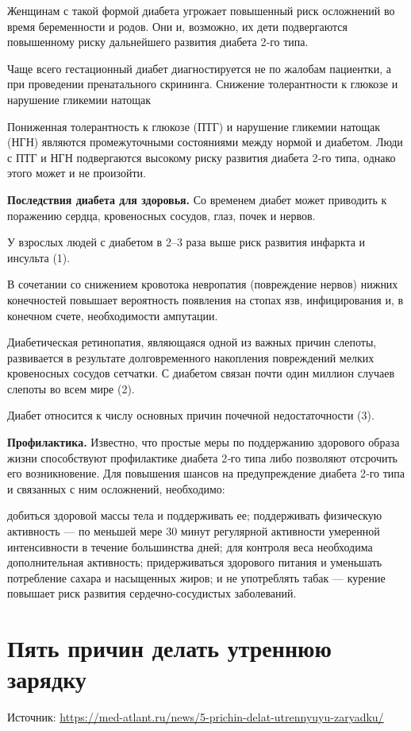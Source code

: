 Женщинам с такой формой диабета угрожает повышенный риск осложнений во время беременности и родов. Они и, возможно, их дети подвергаются повышенному риску дальнейшего развития диабета 2‑го типа.

Чаще всего гестационный диабет диагностируется не по жалобам пациентки, а при проведении пренатального скрининга.
Снижение толерантности к глюкозе и нарушение гликемии натощак

Пониженная толерантность к глюкозе (ПТГ) и нарушение гликемии натощак (НГН) являются промежуточными состояниями между нормой и диабетом. Люди с ПТГ и НГН подвергаются высокому риску развития диабета 2‑го типа, однако этого может и не произойти.


\textbf{Последствия диабета для здоровья.}
Со временем диабет может приводить к поражению сердца, кровеносных сосудов, глаз, почек и нервов.

У взрослых людей с диабетом в 2–3 раза выше риск развития инфаркта и инсульта (1).

В сочетании со снижением кровотока невропатия (повреждение нервов) нижних конечностей повышает вероятность появления на стопах язв, инфицирования и, в конечном счете, необходимости ампутации.

Диабетическая ретинопатия, являющаяся одной из важных причин слепоты, развивается в результате долговременного накопления повреждений мелких кровеносных сосудов сетчатки. С диабетом связан почти один миллион случаев слепоты во всем мире (2).

Диабет относится к числу основных причин почечной недостаточности (3).

\textbf{Профилактика.} Известно, что простые меры по поддержанию здорового образа жизни способствуют профилактике диабета 2‑го типа либо позволяют отсрочить его возникновение. Для повышения шансов на предупреждение диабета 2‑го типа и связанных с ним осложнений, необходимо:

добиться здоровой массы тела и поддерживать ее; поддерживать физическую активность — по меньшей мере 30 минут регулярной активности умеренной интенсивности в течение большинства дней; для контроля веса необходима дополнительная активность; придерживаться здорового питания и уменьшать потребление сахара и насыщенных жиров; и не употреблять табак — курение повышает риск развития сердечно-сосудистых заболеваний.


\section{Пять причин делать утреннюю зарядку}
Источник: \url{https://med-atlant.ru/news/5-prichin-delat-utrennyuyu-zaryadku/}

